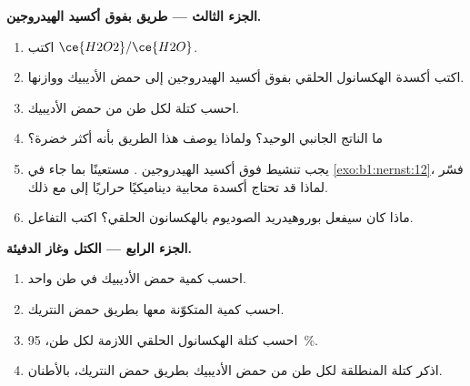 \begin{problem}
\medskip
\noindent\textbf{الجزء الثالث --- طريق بفوق أكسيد الهيدروجين.}
\begin{enumerate}[resume]
  \item اكتب  $\ce{H2O2}/\ce{H2O}$.
  \item اكتب أكسدة الهكسانول الحلقي بفوق أكسيد
        الهيدروجين إلى حمض الأديبيك ووازنها.
  \item احسب كتلة  لكل طن من حمض الأديبيك.
  \item ما الناتج الجانبي الوحيد؟ ولماذا يوصف هذا الطريق بأنه أكثر خضرة؟
  \item يجب تنشيط فوق أكسيد الهيدروجين . مستعينًا
        بما جاء في \cref{exo:b1:nernst:12}، فسّر لماذا قد تحتاج أكسدة محابية
        ديناميكيًا حراريًا إلى  مع ذلك.
  \item ماذا كان سيفعل بوروهيدريد الصوديوم بالهكسانون الحلقي؟ اكتب
        التفاعل.
\end{enumerate}

\medskip
\noindent\textbf{الجزء الرابع --- الكتل وغاز الدفيئة.}
\begin{enumerate}[resume]
  \item احسب كمية حمض الأديبيك في طن واحد.
  \item احسب كمية  المتكوّنة معها بطريق حمض النتريك.
  \item احسب كتلة الهكسانول الحلقي اللازمة لكل طن، 
        \qty{95}{\percent}.
  \item اذكر كتلة  المنطلقة لكل طن من حمض الأديبيك بطريق
        حمض النتريك، بالأطنان.
\end{enumerate}
\end{problem}
